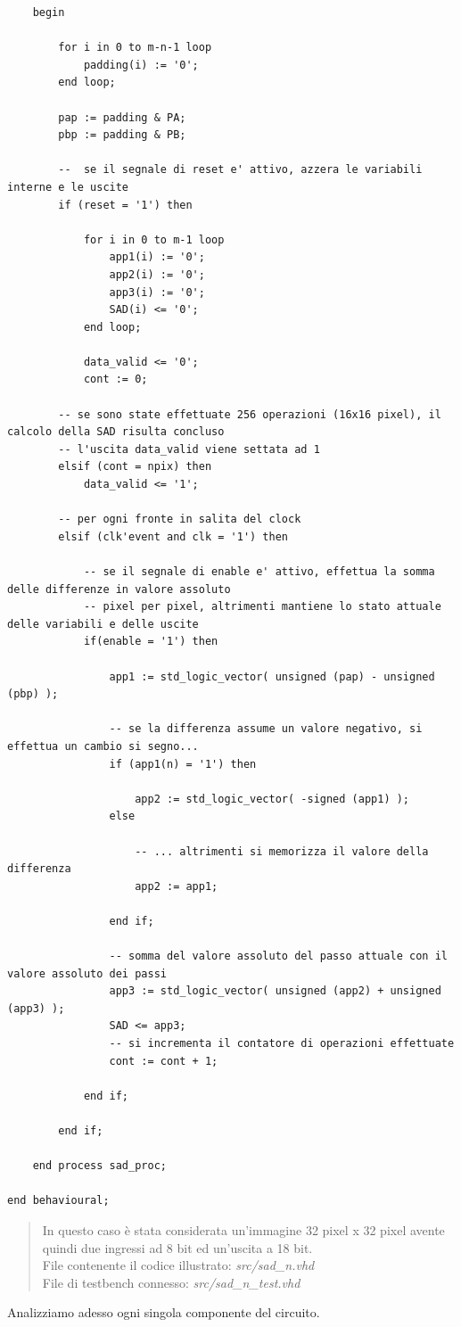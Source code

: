 \documentclass[12pt, a4paper]{article}
\begin{document}
{\begin{verbatim}
	begin

		for i in 0 to m-n-1 loop
			padding(i) := '0';
		end loop;

		pap := padding & PA;
		pbp := padding & PB;		
		
		--  se il segnale di reset e' attivo, azzera le variabili interne e le uscite 
		if (reset = '1') then

			for i in 0 to m-1 loop
				app1(i) := '0';
				app2(i) := '0';
				app3(i) := '0';
				SAD(i) <= '0';
			end loop;
			
			data_valid <= '0';
			cont := 0;
		
		-- se sono state effettuate 256 operazioni (16x16 pixel), il calcolo della SAD risulta concluso 
		-- l'uscita data_valid viene settata ad 1
		elsif (cont = npix) then
			data_valid <= '1';

		-- per ogni fronte in salita del clock 
		elsif (clk'event and clk = '1') then

			-- se il segnale di enable e' attivo, effettua la somma delle differenze in valore assoluto
			-- pixel per pixel, altrimenti mantiene lo stato attuale delle variabili e delle uscite
			if(enable = '1') then		
	
				app1 := std_logic_vector( unsigned (pap) - unsigned (pbp) );

				-- se la differenza assume un valore negativo, si effettua un cambio si segno...
				if (app1(n) = '1') then

					app2 := std_logic_vector( -signed (app1) );
				else 
		
					-- ... altrimenti si memorizza il valore della differenza
					app2 := app1;

				end if;

				-- somma del valore assoluto del passo attuale con il valore assoluto dei passi 
				app3 := std_logic_vector( unsigned (app2) + unsigned (app3) );
				SAD <= app3;
				-- si incrementa il contatore di operazioni effettuate
				cont := cont + 1;

			end if;

		end if;

	end process sad_proc;
		
end behavioural;
\end{verbatim}
}
\begin{quote}
In questo caso è stata considerata un'immagine 32 pixel x 32 pixel avente quindi due ingressi ad 8 bit ed un'uscita a 18 bit.\\
File contenente il codice illustrato: \textit{src/sad\_n.vhd}\\
File di testbench connesso: \textit{src/sad\_n\_test.vhd}
\end{quote}
\newpage
Analizziamo adesso ogni singola componente del circuito.
\end{document}
